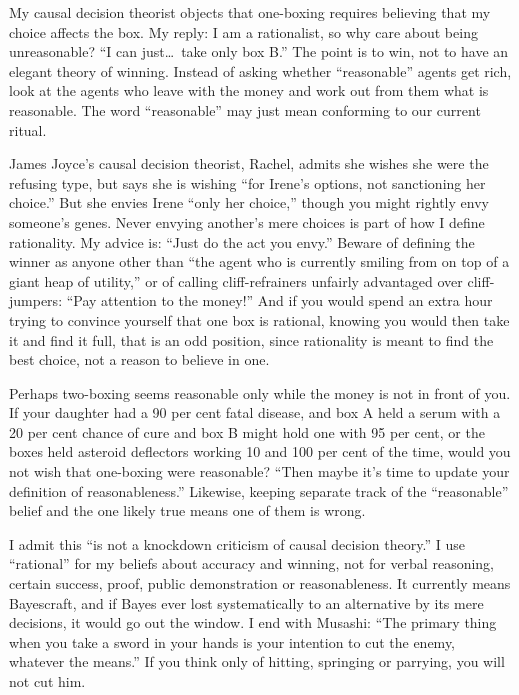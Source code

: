 My causal decision theorist objects that one-boxing requires believing that my choice affects the box. My reply: I am a rationalist, so why care about being unreasonable? ``I can just\ldots\ take only box B.'' The point is to win, not to have an elegant theory of winning. Instead of asking whether ``reasonable'' agents get rich, look at the agents who leave with the money and work out from them what is reasonable. The word ``reasonable'' may just mean conforming to our current ritual. 

James Joyce's causal decision theorist, Rachel, admits she wishes she were the refusing type, but says she is wishing ``for Irene's options, not sanctioning her choice.'' But she envies Irene ``only her choice,'' though you might rightly envy someone's genes. Never envying another's mere choices is part of how I define rationality. My advice is: ``Just do the act you envy.'' Beware of defining the winner as anyone other than ``the agent who is currently smiling from on top of a giant heap of utility,'' or of calling cliff-refrainers unfairly advantaged over cliff-jumpers: ``Pay attention to the money!'' And if you would spend an extra hour trying to convince yourself that one box is rational, knowing you would then take it and find it full, that is an odd position, since rationality is meant to find the best choice, not a reason to believe in one. 

Perhaps two-boxing seems reasonable only while the money is not in front of you. If your daughter had a 90 per cent fatal disease, and box A held a serum with a 20 per cent chance of cure and box B might hold one with 95 per cent, or the boxes held asteroid deflectors working 10 and 100 per cent of the time, would you not wish that one-boxing were reasonable? ``Then maybe it's time to update your definition of reasonableness.'' Likewise, keeping separate track of the ``reasonable'' belief and the one likely true means one of them is wrong. 

I admit this ``is not a knockdown criticism of causal decision theory.'' I use ``rational'' for my beliefs about accuracy and winning, not for verbal reasoning, certain success, proof, public demonstration or reasonableness. It currently means Bayescraft, and if Bayes ever lost systematically to an alternative by its mere decisions, it would go out the window.  I end with Musashi: ``The primary thing when you take a sword in your hands is your intention to cut the enemy, whatever the means.'' If you think only of hitting, springing or parrying, you will not cut him.
